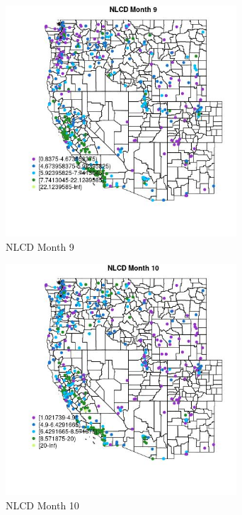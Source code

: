 \begin{figure} 
\centering  
\includegraphics[width=0.77\textwidth]{Code_Outputs/ML_input_report_ML_input_PM25_Step5_part_d_de_duplicated_aves_ML_input_MapObsMo9NLCD.jpg} 
\caption{\label{fig:ML_input_report_ML_input_PM25_Step5_part_d_de_duplicated_aves_ML_inputMapObsMo9NLCD}NLCD Month 9} 
\end{figure} 
 

\begin{figure} 
\centering  
\includegraphics[width=0.77\textwidth]{Code_Outputs/ML_input_report_ML_input_PM25_Step5_part_d_de_duplicated_aves_ML_input_MapObsMo10NLCD.jpg} 
\caption{\label{fig:ML_input_report_ML_input_PM25_Step5_part_d_de_duplicated_aves_ML_inputMapObsMo10NLCD}NLCD Month 10} 
\end{figure} 
 

